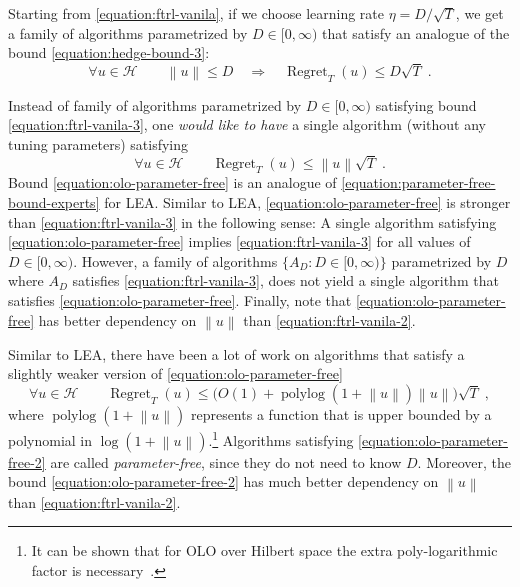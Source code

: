 \documentclass{colt2016} %
\DeclareMathOperator{\Regret}{Regret}
\DeclareMathOperator{\polylog}{polylog}
\renewcommand{\H}{\mathcal{H}}  %
\newcommand{\norm}[1]{\left\|{#1}\right\|}
\begin{document}
Starting from \eqref{equation:ftrl-vanila}, if we choose learning rate $\eta =
D/\sqrt{T}$, we get a family of algorithms parametrized by $D \in [0,\infty)$
that satisfy an analogue of the bound \eqref{equation:hedge-bound-3}:
\begin{equation}
\label{equation:ftrl-vanila-3}
\forall u \in \H \qquad \norm{u} \le D \quad  \Longrightarrow \quad \Regret_T(u) \le D \sqrt{T} \; .
\end{equation}

Instead of family of algorithms parametrized by $D \in [0,\infty)$ satisfying
bound \eqref{equation:ftrl-vanila-3}, one \emph{would like
to have} a single algorithm (without any tuning parameters) satisfying
\begin{equation}
\label{equation:olo-parameter-free}
\forall u \in \H \qquad \Regret_T(u) \le \norm{u} \sqrt{T} \; .
\end{equation}
Bound \eqref{equation:olo-parameter-free} is an analogue of
\eqref{equation:parameter-free-bound-experts} for LEA. Similar to LEA,
\eqref{equation:olo-parameter-free} is stronger than
\eqref{equation:ftrl-vanila-3} in the following sense: A single algorithm
satisfying \eqref{equation:olo-parameter-free} implies
\eqref{equation:ftrl-vanila-3} for all values of $D \in [0,\infty)$.  However,
a family of algorithms $\{A_D : D \in [0,\infty)\}$ parametrized by $D$ where
$A_D$ satisfies \eqref{equation:ftrl-vanila-3}, does not yield a single
algorithm that satisfies \eqref{equation:olo-parameter-free}.  Finally, note
that \eqref{equation:olo-parameter-free} has better dependency on $\norm{u}$
than \eqref{equation:ftrl-vanila-2}.

Similar to LEA, there have been a lot of work on algorithms
\citep{Streeter-McMahan-2012, Orabona-2013, McMahan-Abernethy-2013,
McMahan-Orabona-2014} that satisfy a slightly weaker version of
\eqref{equation:olo-parameter-free}
\begin{equation}
\label{equation:olo-parameter-free-2}
\forall u \in \H \qquad \Regret_T(u) \le \big(O(1)+\polylog(1 + \norm{u})\norm{u} \big) \sqrt{T} \; ,
\end{equation}
where $\polylog(1 + \norm{u})$ represents a function that is upper bounded
by a polynomial in $\log(1+\norm{u})$.\footnote{It can be shown
that for OLO over Hilbert space the extra poly-logarithmic factor is
necessary~\citep{McMahan-Abernethy-2013,Orabona-2013}.} Algorithms satisfying
\eqref{equation:olo-parameter-free-2} are called \emph{parameter-free}, since
they do not need to know $D$.  Moreover, the bound
\eqref{equation:olo-parameter-free-2} has much better dependency on $\norm{u}$
than \eqref{equation:ftrl-vanila-2}.
\end{document}
